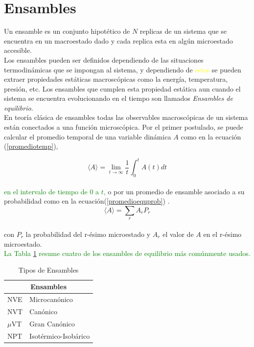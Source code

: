 \section{Ensambles}

Un ensamble es un conjunto hipotético de $N$ replicas de un sistema que se encuentra en un macroestado dado y cada replica esta en algún microestado accesible.\\

Los ensambles pueden ser definidos dependiendo de las situaciones termodinámicas que se impongan al sistema, y dependiendo de \textcolor{yellow}{estos} se pueden extraer propiedades estáticas macroscópicas como la energía, temperatura, presión, etc. Los ensambles que cumplen esta propiedad estática aun cuando el sistema se encuentra evolucionando en el tiempo son llamados \textit{Ensambles de equilibrio}.\\

En teoría clásica de ensambles todas las observables macroscópicas de un sistema están conectados a una función microscópica. Por el primer postulado, se puede calcular el promedio temporal de una variable dinámica $A$ como en la ecuación (\ref{promediotemp}), 

\begin{equation} \label{promediotemp}
    \langle A\rangle = \lim_{t\to\infty}\frac{1}{t}\int_0^t A(t)dt
\end{equation}\\
\textcolor{green}{en el intervalo de tiempo de 0 a $t$,}
o por un promedio de ensamble asociado a su probabilidad como en la ecuación(\ref{promedioequprob}) \cite{tuckerman2010}. \\
\begin{equation} \label{promedioequprob}
    \langle A\rangle =\sum_r A_r P_r
\end{equation}\\
con $P_r$ la probabilidad del r-ésimo microestado y $A_r$ el valor de $A$ en el r-ésimo microestado.\\

\textcolor{green}{La Tabla \ref{tiposEnsamble} resume cuatro de los ensambles de equilibrio más comúnmente usados.}

\begin{table}[h!]
    \centering
    \begin{tabular}{ |p{1cm}||p{4cm}|  }
    \hline
    \multicolumn{2}{|c|}{Ensambles} \\
    \hline
    NVE   & Microcanónico \\
    NVT   & Canónico \\
    $\mu$VT& Gran Canónico \\
    NPT   & Isotérmico-Isobárico \\
    \hline
    \end{tabular}
    \caption{Tipos de Ensambles}
    \label{tiposEnsamble}
\end{table}

